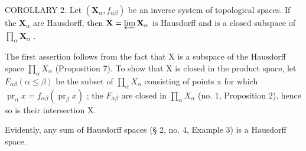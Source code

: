 COROLLARY 2. Let \((\mathbf{X}_{\alpha}, f_{\alpha \beta})\) be an inverse system of topological spaces. If the \(\mathbf{X}_{\alpha}\) are Hausdorff, then \(\mathbf{X} = \varprojlim \mathbf{X}_{\alpha}\) is Hausdorff and is a closed subspace of \(\prod_{\alpha} \mathbf{X}_{\alpha}\) .

The first assertion follows from the fact that X is a subspace of the Hausdorff space \(\prod_{\alpha} X_{\alpha}\) (Proposition 7). To show that X is closed in the product space, let \(F_{\alpha\beta} (\alpha \leqslant \beta)\) be the subset of \(\prod_{\alpha} X_{\alpha}\) consisting of points x for which \(\operatorname{pr}_{\alpha}x = f_{\alpha\beta}(\operatorname{pr}_{\beta}x)\) ; the \(F_{\alpha\beta}\) are closed in \(\prod_{\alpha} X_{\alpha}\) (no. 1, Proposition 2), hence so is their intersection X.

Evidently, any sum of Hausdorff spaces (§ 2, no. 4, Example 3) is a Hausdorff space.


